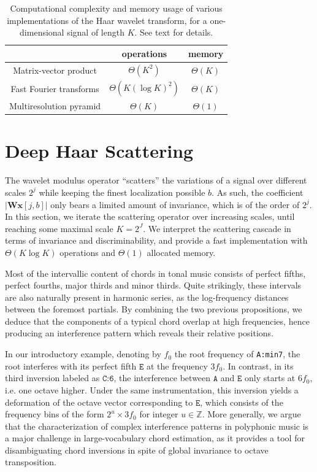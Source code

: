 \documentclass{article}
\makeatletter
\newcommand*{\ie}{i.e.\@\xspace}
\makeatother
\begin{document}
\begin{table}
	\begin{center}
	\begin{tabular}{|c|cc|}
		\hline
		& operations & memory \\
		\hline
		Matrix-vector product & $\Theta(K^2)$ & $\Theta(K)$ \\
		Fast Fourier transforms & $\Theta(K (\log K)^2)$ & $\Theta(K)$ \\
		Multiresolution pyramid & $\Theta(K)$ & $\Theta(1)$ \\
		\hline		
	\end{tabular}
	\end{center}
	\caption{
	Computational complexity and memory usage of various implementations
	of the Haar wavelet transform, for a one-dimensional signal of length $K$.
	See text for details.
	\label{table:wavelet-complexities}}
\end{table}


\section{Deep Haar Scattering}\label{sec:scattering}
The wavelet modulus operator ``scatters'' the variations of a signal over
different scales $2^j$ while keeping the finest localization possible $b$.
As such, the coefficient $\vert \mathbf{W} \boldsymbol{x}[j, b] \vert$
only bears a limited amount of invariance, which is of the order
of $2^j$.
In this section, we iterate the scattering operator over increasing scales,
until reaching some maximal scale $K=2^J$.
We interpret the scattering cascade in terms of invariance and discriminability,
and provide a fast implementation with $\Theta(K \log K)$ operations
and $\Theta(1)$ allocated memory.

Most of the intervallic content of chords in tonal music consists of perfect fifths,
perfect fourths, major thirds and minor thirds.
Quite strikingly, these intervals are also naturally present in harmonic series,
as the log-frequency distances between the foremost partials.
By combining the two previous propositions, we deduce that
the components of a typical chord overlap at high frequencies,
hence producing an interference pattern which reveals their relative positions.

In our introductory example, denoting by $f_0$ the root frequency of \texttt{A:min7},
the root interferes with its perfect fifth $\texttt{E}$ at the frequency $3 f_0$.
In contrast, in its third inversion labeled as $\texttt{C:6}$, the interference
between $\texttt{A}$ and $\texttt{E}$ only starts at $6 f_0$, \ie one octave higher.
Under the same instrumentation, this inversion yields a deformation of the
octave vector corresponding to $\texttt{E}$, which consists of the frequency bins
of the form $2^u \times 3 f_0$ for integer $u \in \mathbb{Z}$.
More generally, we argue that the characterization of complex interference patterns
in polyphonic music is a major challenge in large-vocabulary chord estimation,
as it provides a tool for disambiguating chord inversions in spite of global
invariance to octave transposition.
\end{document}

